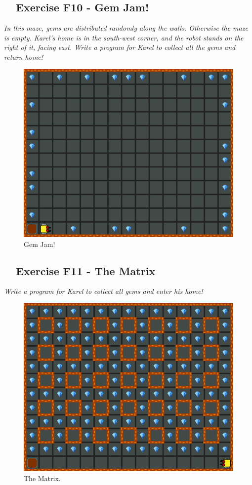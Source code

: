 \documentclass[article,A4,12pt]{llncs}
\begin{document}
{{{{\subsection{\ \ Exercise F10 - Gem Jam!}

{\em In this maze, gems are distributed randomly along the walls. Otherwise 
the maze is empty. Karel's home is in the south-west corner, and the robot 
stands on the right of it, facing east. Write a program for Karel to collect 
all the gems and return home!}\\[-7mm]

\begin{figure}[!ht]
\begin{center}
\includegraphics[height=0.4\textwidth]{img/f10.png}
\end{center}
\vspace{-4mm}
\caption{Gem Jam!}
\label{fig:f10}
\vspace{-10mm}
\end{figure}
\noindent

\newpage

\subsection{\ \ Exercise F11 - The Matrix}

{\em Write a program for Karel to collect all gems and enter his home!}\\[-7mm]

\begin{figure}[!ht]
\begin{center}
\includegraphics[height=0.4\textwidth]{img/f11.png}
\end{center}
\vspace{-4mm}
\caption{The Matrix.}
\label{fig:f11}
\vspace{-10mm}
\end{figure}
\noindent

}}}}
\end{document}
